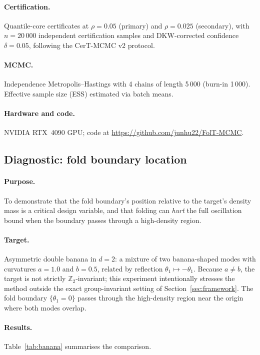 \paragraph{Certification.}
Quantile-core certificates at $\rho = 0.05$ (primary) and
$\rho = 0.025$ (secondary), with $n = 20\,000$ independent
certification samples and DKW-corrected confidence $\delta = 0.05$,
following the CerT-MCMC v2 protocol.

\paragraph{MCMC.}
Independence Metropolis--Hastings with 4 chains of length 5\,000
(burn-in 1\,000).  Effective sample size (ESS) estimated via
batch means.

\paragraph{Hardware and code.}
NVIDIA RTX~4090 GPU; code at
\url{https://github.com/junhu22/FolT-MCMC}.


\subsection{Diagnostic: fold boundary location}
\label{sec:exp_banana}

\paragraph{Purpose.}
To demonstrate that the fold boundary's position relative to
the target's density mass is a critical design variable,
and that folding can \emph{hurt} the full oscillation bound
when the boundary passes through a high-density region.

\paragraph{Target.}
Asymmetric double banana in $d = 2$: a mixture of two
banana-shaped modes with curvatures $a = 1.0$ and $b = 0.5$,
related by reflection $\theta_1 \mapsto -\theta_1$.
Because $a \neq b$, the target is not strictly
$\mathbb{Z}_2$-invariant; this experiment intentionally
stresses the method outside the exact group-invariant setting
of Section~\ref{sec:framework}.
The fold boundary $\{\theta_1 = 0\}$ passes through the
high-density region near the origin where both modes overlap.

\paragraph{Results.}
Table~\ref{tab:banana} summarises the comparison.

